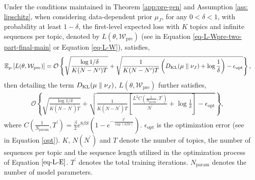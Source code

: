 \begin{theorem} Under the conditions maintained in Theorem \ref{app:pre-gen} and Assumption \ref{ass: lipschitz}, when considering data-dependent prior $\mu_J$, for any $0<\delta < 1$, with probability at least $1-\delta$, the first-level expected loss with $K$ topics and infinite sequences per topic, denoted by $L(\theta, \mathcal{W}_{\text{pre}})$ (see in Equation \ref{eq-L-Wpre-two-part-final-main} or Equation \ref{eq-L-W}), satisfies,
	\label{app:pre-gen-data-dependent}
	\begin{align*}
			\mathbb{E}_{\mu}\left[L(\theta, \mathcal{W}_{\text{pre}})\right]
			=\mathcal{O}\left\{\sqrt{\frac{ \log 1/\delta}{K(N-N^\prime)T}} + \sqrt{\frac{1}{K(N-N^\prime)T}\left(D_{\mathrm{KL}}(\mu\parallel\nu_J)+\log \frac{1}{\delta}\right)-\epsilon_{\text{opt}}}\right\},
	\end{align*}
	then detailing the term $D_{\mathrm{KL}}(\mu \parallel \nu_J)$, $L(\theta, \mathcal{W}_{\text{pre}})$ further satisfies,
	\begin{align}\label{app-theF3}
			\mathcal{O}\left\{\sqrt{\frac{\log 1/\delta}{K(N-N^\prime)T}}+\sqrt{\frac{1}{K(N-N^\prime)T}\left[\frac{L^2C(\frac{1}{N_{\text{param}}},T^\prime)}{N^\prime}+\log \frac{1}{\delta}\right]-\epsilon_{\text{opt}}}\right\},
	\end{align}
    where $C(\frac{1}{N_{\text{param}}},T^\prime)=\frac{\beta}{2}e^{8\beta S}\left(1-e^{-\frac{{T^\prime}}{\exp(8\beta S)}}\right)$. $\epsilon_{\text{opt}}$ is the optimization error (see in Equation \ref{opt}). $K$, $N (N^\prime)$ and $T$ denote the number of topics, the number of sequences per topic and the sequence length utilized in the optimization process of Equation $\ref{eq-L-E}$. $T^\prime$ denotes the total training iterations. $N_{\text{param}}$ denotes the number of model parameters.
\end{theorem}

